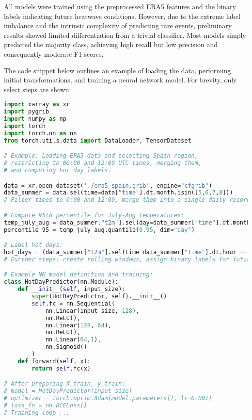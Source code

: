 \documentclass[12pt,a4paper]{article}
\begin{document}
All models were trained using the preprocessed ERA5 features and the binary labels indicating future heatwave conditions. However, due to the extreme label imbalance and the intrinsic complexity of predicting rare events, preliminary results showed limited differentiation from a trivial classifier. Most models simply predicted the majority class, achieving high recall but low precision and consequently moderate F1 scores.

The code snippet below outlines an example of loading the data, performing initial transformations, and training a neural network model. For brevity, only select steps are shown:

\begin{lstlisting}[language=Python, basicstyle=\ttfamily\small]
import xarray as xr
import pygrib
import numpy as np
import torch
import torch.nn as nn
from torch.utils.data import DataLoader, TensorDataset

# Example: Loading ERA5 data and selecting Spain region, 
# restricting to 00:00 and 12:00 UTC times, merging them,
# and computing hot day labels.

data = xr.open_dataset('./era5_spain.grib', engine="cfgrib")
data_summer = data.sel(time=data["time"].dt.month.isin([5,6,7,8]))
# Filter times to 0:00 and 12:00, merge them into a single daily record, etc.

# Compute 95th percentile for July-Aug temperatures:
temp_july_aug = data_summer["t2m"].sel(day=data_summer["time"].dt.month.isin([7,8]))
percentile_95 = temp_july_aug.quantile(0.95, dim="day")

# Label hot days:
hot_days = (data_summer["t2m"].sel(time=data_summer["time"].dt.hour == 12) > percentile_95)
# Further steps: create rolling windows, assign binary labels for future 7-day hot spells.

# Example NN model definition and training:
class HotDayPredictor(nn.Module):
    def __init__(self, input_size):
        super(HotDayPredictor, self).__init__()
        self.fc = nn.Sequential(
            nn.Linear(input_size, 128),
            nn.ReLU(),
            nn.Linear(128, 64),
            nn.ReLU(),
            nn.Linear(64,1),
            nn.Sigmoid()
        )
    def forward(self, x):
        return self.fc(x)

# After preparing X_train, y_train:
# model = HotDayPredictor(input_size)
# optimizer = torch.optim.Adam(model.parameters(), lr=0.001)
# loss_fn = nn.BCELoss()
# Training loop ...
\end{lstlisting}
\end{document}
